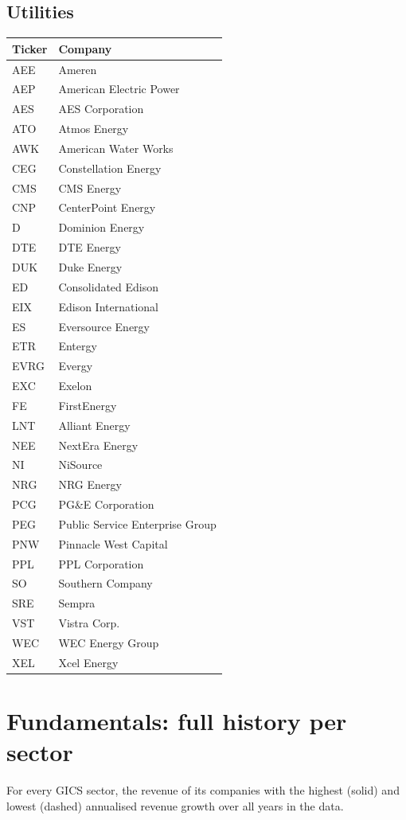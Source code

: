 \documentclass[11pt,a4paper]{article}
\begin{document}
\subsection{Utilities}
\begin{table}[H]
\centering
\small
\begin{tabular}{lp{11cm}}
\hline
Ticker & Company \\
\hline
AEE & Ameren \\
AEP & American Electric Power \\
AES & AES Corporation \\
ATO & Atmos Energy \\
AWK & American Water Works \\
CEG & Constellation Energy \\
CMS & CMS Energy \\
CNP & CenterPoint Energy \\
D & Dominion Energy \\
DTE & DTE Energy \\
DUK & Duke Energy \\
ED & Consolidated Edison \\
EIX & Edison International \\
ES & Eversource Energy \\
ETR & Entergy \\
EVRG & Evergy \\
EXC & Exelon \\
FE & FirstEnergy \\
LNT & Alliant Energy \\
NEE & NextEra Energy \\
NI & NiSource \\
NRG & NRG Energy \\
PCG & PG\&E Corporation \\
PEG & Public Service Enterprise Group \\
PNW & Pinnacle West Capital \\
PPL & PPL Corporation \\
SO & Southern Company \\
SRE & Sempra \\
VST & Vistra Corp. \\
WEC & WEC Energy Group \\
XEL & Xcel Energy \\
\hline
\end{tabular}
\end{table}
\section{Fundamentals: full history per sector}
\label{app:fundamentals}
For every GICS sector, the revenue of its companies with the highest (solid) and lowest (dashed) annualised revenue growth over all years in the data.
\end{document}
